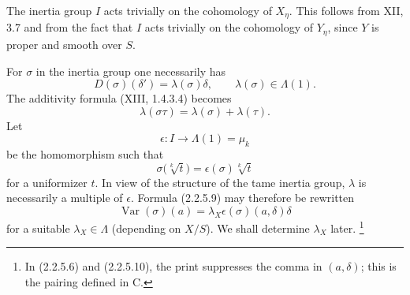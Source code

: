 The inertia group $I$ acts trivially on the cohomology of $X_\eta$.
This follows from XII, 3.7 and from the fact that $I$ acts trivially
on the cohomology of $Y_\eta$, since $Y$ is proper and smooth over
$S$.

For $\sigma$ in the inertia group one necessarily has
\begin{equation}\tag{2.2.5.9}
D(\sigma)(\delta')=\lambda(\sigma)\delta,
\qquad \lambda(\sigma)\in\Lambda(1).
\end{equation}
The additivity formula (XIII, 1.4.3.4) becomes
\[
\lambda(\sigma\tau)=\lambda(\sigma)+\lambda(\tau).
\]
Let
\[
\epsilon:I\longrightarrow\Lambda(1)=\mu_k
\]
be the homomorphism such that
\[
\sigma\bigl(\sqrt[k]{t}\bigr)
=\epsilon(\sigma)\sqrt[k]{t}
\]
for a uniformizer $t$.  In view of the structure of the tame inertia
group, $\lambda$ is necessarily a multiple of $\epsilon$.  Formula
(2.2.5.9) may therefore be rewritten
\begin{equation}\tag{2.2.5.10}
\operatorname{Var}(\sigma)(a)
=\lambda_X\epsilon(\sigma)(a,\delta)\delta
\end{equation}
for a suitable $\lambda_X\in\Lambda$ (depending on $X/S$).  We shall
determine $\lambda_X$ later.
\footnote{In (2.2.5.6) and (2.2.5.10), the print suppresses the comma
in $(a,\delta)$; this is the pairing defined in C.}

